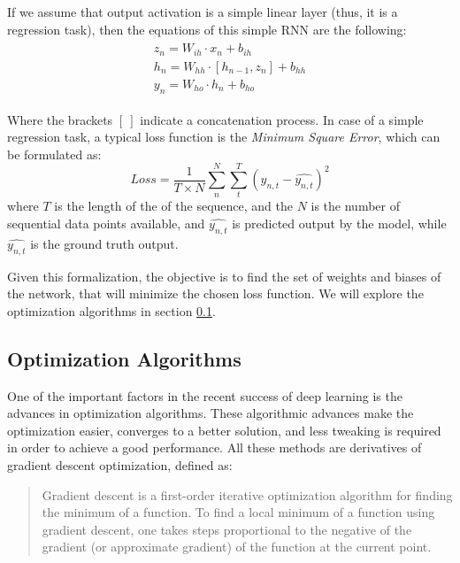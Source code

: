 \par If we assume that output activation is a simple linear layer (thus, it is a regression task), then the equations of this simple RNN are the following:
\begin{align}
    \begin{split}
    z_n = W_{ih} \cdot x_{n} + b_{ih}
    \\
    h_n = W_{hh} \cdot [h_{n-1}, z_{n}] + b_{hh}
    \\
    y_n = W_{ho} \cdot h_{n} + b_{ho}
    \label{eq:rnn_equations}
    \end{split}
\end{align}

\par Where the brackets $[\ ]$ indicate a concatenation process. In case of a simple regression task, a typical loss function is the \textit{Minimum Square Error}, which can be formulated as:
\begin{equation}
    Loss = \frac{1}{T \times N} \sum_{n}^{N} \sum_{t}^{T} \left ( y_{n, t} - \hat{y_{n, t}}\right )^2
    \label{eq:loss_fn_mse}
\end{equation}
where $T$ is the length of the of the sequence, and the $N$ is the number of sequential data points available, and $\hat{y_{n, t}}$ is predicted output by the model, while $\hat{y_{n, t}}$ is the ground truth output.

\par Given this formalization, the objective is to find the set of weights and biases of the network, that will minimize the chosen loss function. We will explore the optimization algorithms in section \ref{subsec:optimization}.

\subsection{Optimization Algorithms} \label{subsec:optimization}
\par One of the important factors in the recent success of deep learning is the advances in optimization algorithms. These algorithmic advances make the optimization easier, converges to a better solution, and less tweaking is required in order to achieve a good performance. All these methods are derivatives of gradient descent optimization, defined as\citep{gradientdescent}:

\begin{quote}
    Gradient descent is a first-order iterative optimization algorithm for finding the minimum of a function. To find a local minimum of a function using gradient descent, one takes steps proportional to the negative of the gradient (or approximate gradient) of the function at the current point.
\end{quote}

